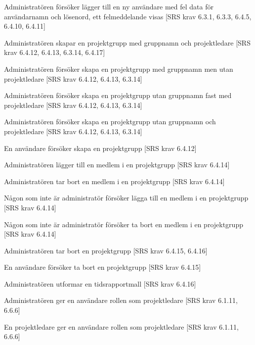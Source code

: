 \documentclass[a4paper]{article}
\begin{document}
\begin{appendices}
\begin{FT}
\item
Administratören försöker lägger till en ny användare med fel data för användarnamn och lösenord, ett felmeddelande visas [SRS krav 6.3.1, 6.3.3, 6.4.5, 6.4.10, 6.4.11]

\item 
Administratören skapar en projektgrupp med gruppnamn och projektledare [SRS krav 6.4.12, 6.4.13, 6.3.14, 6.4.17]

\item 
Administratören försöker skapa en projektgrupp med gruppnamn men utan projektledare [SRS krav 6.4.12, 6.4.13, 6.3.14]

\item 
Administratören försöker skapa en projektgrupp utan gruppnamn fast med projektledare [SRS krav 6.4.12, 6.4.13, 6.3.14]

\item 
Administratören försöker skapa en projektgrupp utan gruppnamn och projektledare [SRS krav 6.4.12, 6.4.13, 6.3.14]

\item
En användare försöker skapa en projektgrupp [SRS krav 6.4.12]

\item 
Administratören lägger till en medlem i en projektgrupp [SRS krav 6.4.14]

\item 
Administratören tar bort en medlem i en projektgrupp [SRS krav 6.4.14]

\item 
Någon som inte är administratör försöker lägga till en medlem i en projektgrupp [SRS krav 6.4.14]

\item 
Någon som inte är administratör försöker ta bort en medlem i en projektgrupp [SRS krav 6.4.14]

\item
Administratören tar bort en projektgrupp [SRS krav 6.4.15, 6.4.16]

\item
En användare försöker ta bort en projektgrupp [SRS krav 6.4.15]

\item 
Administratören utformar en tidsrapportmall [SRS krav 6.4.16]

\item
Administratören ger en användare rollen som projektledare [SRS krav 6.1.11, 6.6.6]

\item
En projektledare ger en användare rollen som projektledare [SRS krav 6.1.11, 6.6.6]


\end{FT}
\end{appendices}
\end{document}

